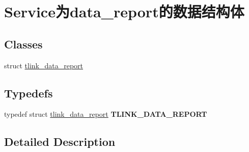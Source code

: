 \hypertarget{group__service_xE4_xB8_xBAdata__report_xE7_x9A_x84_xE6_x95_xB0_xE6_x8D_xAE_xE7_xBB_x93_xE6_x9E_x84_xE4_xBD_x93}{}\section{Service为data\+\_\+report的数据结构体}
\label{group__service_xE4_xB8_xBAdata__report_xE7_x9A_x84_xE6_x95_xB0_xE6_x8D_xAE_xE7_xBB_x93_xE6_x9E_x84_xE4_xBD_x93}
\subsection*{Classes}
\begin{DoxyCompactItemize}
\item 
struct \mbox{\hyperlink{structtlink__data__report}{tlink\+\_\+data\+\_\+report}}
\end{DoxyCompactItemize}
\subsection*{Typedefs}
\begin{DoxyCompactItemize}
\item 
\mbox{\label{group__service_xE4_xB8_xBAdata__report_xE7_x9A_x84_xE6_x95_xB0_xE6_x8D_xAE_xE7_xBB_x93_xE6_x9E_x84_xE4_xBD_x93_ga9c6f01131554131549fedeac6babacd0}} 
typedef struct \mbox{\hyperlink{structtlink__data__report}{tlink\+\_\+data\+\_\+report}} {\bfseries T\+L\+I\+N\+K\+\_\+\+D\+A\+T\+A\+\_\+\+R\+E\+P\+O\+RT}
\end{DoxyCompactItemize}


\subsection{Detailed Description}
